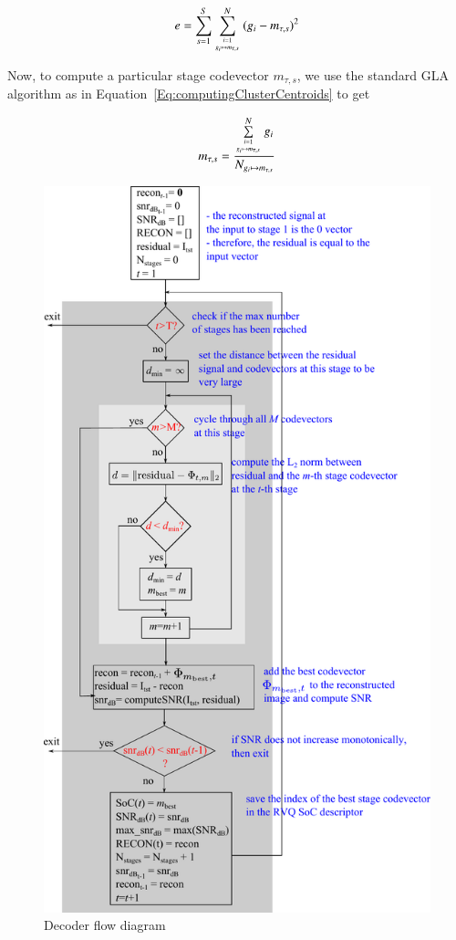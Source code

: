 \begin{equation}
e = \sum_{s=1}^S\sum\limits_{{i=1 \atop g_i \mapsto m_{\tau, s}}}^N{(g_i - m_{\tau, s})}^2
\end{equation} 

Now, to compute a particular stage codevector $m_{\tau, s}$, we use the standard GLA algorithm as in Equation~\ref{Eq:computingClusterCentroids} to get

\begin{equation}
m_{\tau, s} = \frac{\sum\limits_{{i=1 \atop g_i \mapsto m_{\tau, s}}}^N g_i}{N_{g_i \mapsto m_{\tau, s}}}
\label{Eq:finalCAC}
\end{equation}

\begin{figure}[ht]
\centering
\includegraphics[height=0.6\textheight]{thesis/RVQ_explorer_flowDiagram.pdf}
\caption{Decoder flow diagram}
\label{fig:RVQ_decoderFlowDiagram}
\end{figure}



